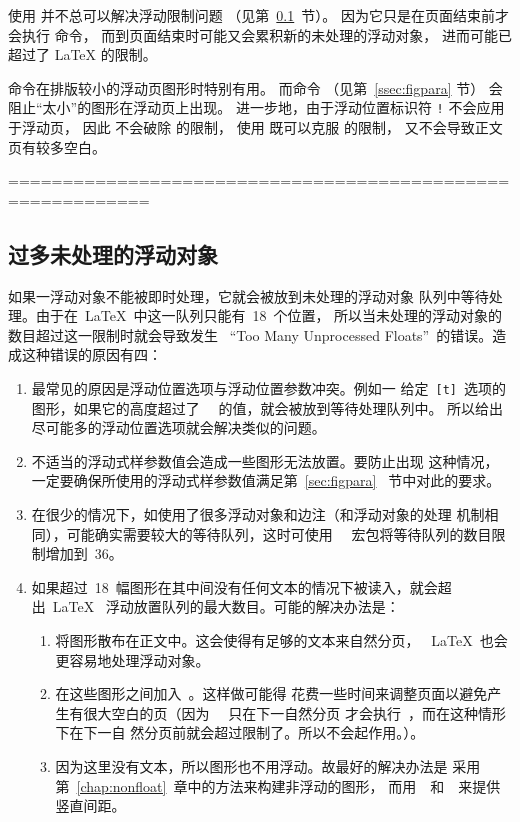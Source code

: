 \begin{description}
	使用  并不总可以解决浮动限制问题
	（见第~\ref{ssec:toomanyfig}~节）。
	因为它只是在页面结束前才会执行  命令，
	而到页面结束时可能又会累积新的未处理的浮动对象，
	进而可能已超过了 \LaTeX{} 的限制。
	
	 命令在排版较小的浮动页图形时特别有用。
	而命令  （见第~\ref{ssec:figpara} 节）
	会阻止“太小”的图形在浮动页上出现。
	进一步地，由于浮动位置标识符 \texttt{!} 	不会应用于浮动页，
	因此 \opt{[!p]} 不会破除  的限制，
	使用  既可以克服  的限制，
	又不会导致正文页有较多空白。
\end{description}


===========================================================
\subsection{过多未处理的浮动对象}\label{ssec:toomanyfig}

如果一浮动对象不能被即时处理，它就会被放到未处理的浮动对象
队列中等待处理。由于在~\LaTeX{}~中这一队列只能有~18~个位置，
所以当未处理的浮动对象的数目超过这一限制时就会导致发生
~``Too Many Unprocessed Floats''~的错误。造成这种错误的原因有四：
\begin{enumerate}
	\item 最常见的原因是浮动位置选项与浮动位置参数冲突。例如一
	给定~\texttt{[t]}~选项的图形，如果它的高度超过了
	~~的值，就会被放到等待处理队列中。
	所以给出尽可能多的浮动位置选项就会解决类似的问题。
	\item 不适当的浮动式样参数值会造成一些图形无法放置。要防止出现
	这种情况，一定要确保所使用的浮动式样参数值满足第~\ref{sec:figpara}~
	节中对此的要求。
	\item 在很少的情况下，如使用了很多浮动对象和边注（和浮动对象的处理
	机制相同），可能确实需要较大的等待队列，这时可使用~~
	宏包将等待队列的数目限制增加到~36。
	\item 如果超过~18~幅图形在其中间没有任何文本的情况下被读入，就会超出~\LaTeX{}~
	浮动放置队列的最大数目。可能的解决办法是：
	\begin{enumerate}
		\item 将图形散布在正文中。这会使得有足够的文本来自然分页，
		~\LaTeX{}~也会更容易地处理浮动对象。
		\item 在这些图形之间加入~。这样做可能得
		花费一些时间来调整页面以避免产生有很大空白的页（因为
		~~只在下一自然分页
		才会执行~，而在这种情形下在下一自
		然分页前就会超过限制了。所以不会起作用。）。
		\item 因为这里没有文本，所以图形也不用浮动。故最好的解决办法是
		采用第~\ref{chap:nonfloat}~章中的方法来构建非浮动的图形，
		而用~~和~~来提供竖直间距。
	\end{enumerate}
\end{enumerate}

